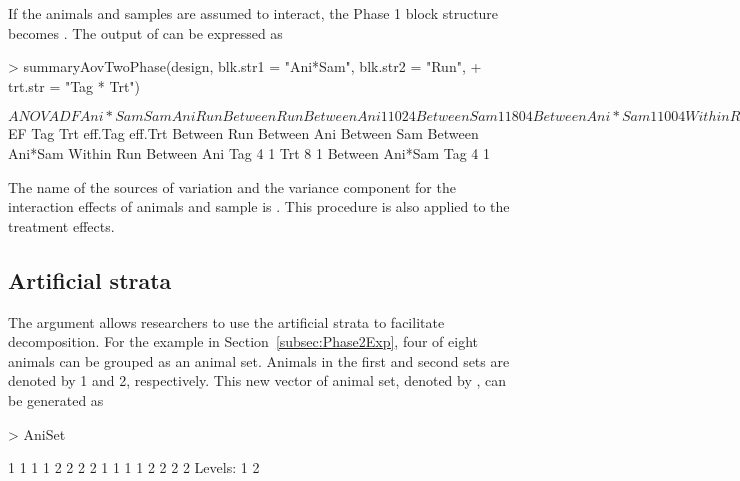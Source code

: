 \documentclass[article]{jss}
\begin{document}
If the animals and samples are assumed to interact, the Phase 1 block structure becomes . The output of  can be expressed as
\begin{CodeChunk}
\begin{CodeInput}
> summaryAovTwoPhase(design, blk.str1 = "Ani*Sam", blk.str2 = "Run", 
+ trt.str = "Tag * Trt")                                     
\end{CodeInput}
\begin{CodeOutput}
$ANOVA
                   DF Ani*Sam Sam Ani Run
Between Run                              
   Between Ani     1  1       0   2   4  
   Between Sam     1  1       8   0   4  
   Between Ani*Sam 1  1       0   0   4  
Within Run                               
   Between Ani                           
      Tag          1  1       0   2   0  
      Trt          1  1       0   2   0  
      Residual     4  1       0   2   0  
   Between Ani*Sam                       
      Tag          2  1       0   0   0  
      Residual     4  1       0   0   0  

$EF
                   Tag Trt eff.Tag eff.Trt
Between Run                               
   Between Ani                            
   Between Sam                            
   Between Ani*Sam                        
Within Run                                
   Between Ani                            
      Tag          4       1              
      Trt              8           1      
   Between Ani*Sam                        
      Tag          4       1                  
\end{CodeOutput}
\end{CodeChunk}
The name of the sources of variation and the variance component for the interaction effects of animals and sample is . This procedure is also applied to the treatment effects. 

\subsection{Artificial strata}
The  argument allows researchers to use the artificial strata to facilitate decomposition. For the example in Section~\ref{subsec:Phase2Exp}, four of eight animals can be grouped as an animal set. Animals in the first and second sets are denoted by 1 and 2, respectively. This new vector of animal set, denoted by , can be generated as
\begin{CodeChunk}
\begin{CodeInput}
> AniSet
\end{CodeInput}
\begin{CodeOutput}
 [1] 1 1 1 1 2 2 2 2 1 1 1 1 2 2 2 2
Levels: 1 2
\end{CodeOutput}
\end{CodeChunk}
\end{document}
